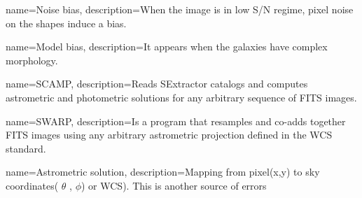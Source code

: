 {
    name=Noise bias,
    description={When the image is in low S/N regime, pixel noise on the shapes induce a bias. }
}

{
    name=Model bias,
    description={It appears when the galaxies have complex morphology. }
}

{
    name=SCAMP,
    description={Reads SExtractor catalogs and computes astrometric and photometric solutions for any arbitrary sequence of FITS images. }
}

{
    name=SWARP,
    description={Is a program that resamples and co-adds together FITS images using any arbitrary astrometric projection defined in the WCS standard. }
}

{
    name=Astrometric solution,
    description={Mapping from pixel(x,y) to
sky coordinates( $\theta$ ,  $\phi$) or WCS). This is another source of errors } 
}



